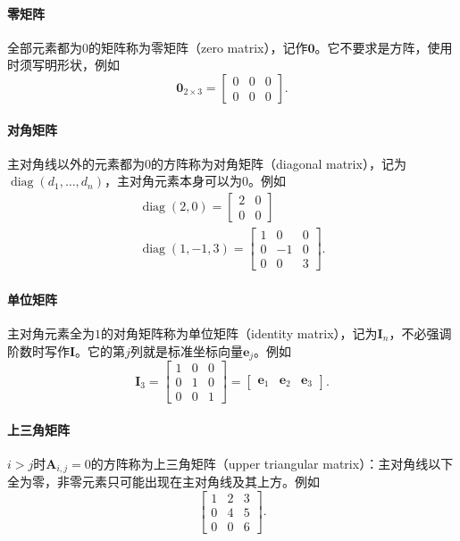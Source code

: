 \paragraph{零矩阵}
全部元素都为$0$的矩阵称为零矩阵（zero matrix），记作$\bm0$。它不要求是方阵，使用时须写明形状，例如
\[
 \bm0_{2\times3}=\begin{bmatrix}0&0&0\\0&0&0\end{bmatrix}.
\]

\paragraph{对角矩阵}
主对角线以外的元素都为$0$的方阵称为对角矩阵（diagonal matrix），记为$\operatorname{diag}(d_1,\ldots,d_n)$，主对角元素本身可以为$0$。例如
\[
\begin{gathered}
\operatorname{diag}(2,0)=\begin{bmatrix}2&0\\0&0\end{bmatrix}\\
\operatorname{diag}(1,-1,3)=\begin{bmatrix}1&0&0\\0&-1&0\\0&0&3\end{bmatrix}.
\end{gathered}
\]

\paragraph{单位矩阵}
主对角元素全为$1$的对角矩阵称为单位矩阵（identity matrix），记为$\bm I_n$，不必强调阶数时写作$\bm I$。它的第$j$列就是标准坐标向量$\bm e_j$。例如
\[
 \bm I_3=\begin{bmatrix}1&0&0\\0&1&0\\0&0&1\end{bmatrix}=\begin{bmatrix}\bm e_1&\bm e_2&\bm e_3\end{bmatrix}.
\]

\paragraph{上三角矩阵}
$i>j$时$\bm A_{i,j}=0$的方阵称为上三角矩阵（upper triangular matrix）：主对角线以下全为零，非零元素只可能出现在主对角线及其上方。例如
\[
 \begin{bmatrix}1&2&3\\0&4&5\\0&0&6\end{bmatrix}.
\]

